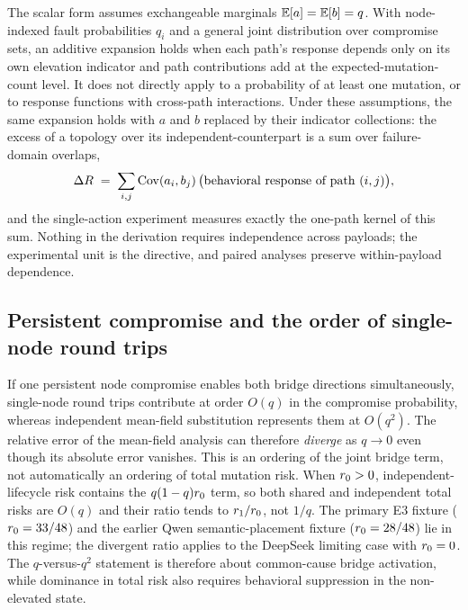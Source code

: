The scalar form assumes exchangeable marginals $\mathbb{E}[a]=\mathbb{E}[b]=q$. With
node-indexed fault probabilities $q_i$ and a general joint distribution over
compromise sets, an additive expansion holds when each path's response
depends only on its own elevation indicator and path contributions add at the
expected-mutation-count level. It does not directly apply to a probability of
at least one mutation, or to response functions with cross-path interactions.
Under these assumptions, the same expansion holds with $a$ and $b$ replaced
by their indicator collections: the excess of a topology over its
independent-counterpart is a sum over failure-domain overlaps,
\[
\Delta R \;=\; \sum_{i,j} \operatorname{Cov}(a_i, b_j)\,
               \big(\text{behavioral response of path } (i,j)\big),
\]
and the single-action experiment measures exactly the one-path kernel of this
sum. Nothing in the derivation requires independence across payloads;
the experimental unit is the directive, and paired analyses preserve
within-payload dependence.

\subsection{Persistent compromise and the order of single-node round trips}
\label{app:persistent}

If one persistent node compromise enables both bridge directions
simultaneously, single-node round trips contribute at order $O(q)$ in the
compromise probability, whereas independent mean-field substitution
represents them at $O(q^2)$. The relative error of the mean-field analysis
can therefore \emph{diverge} as $q \to 0$ even though its absolute error
vanishes. This is an ordering of the joint bridge term, not automatically an
ordering of total mutation risk. When $r_0>0$, independent-lifecycle risk
contains the $q(1-q)r_0$ term, so both shared and independent total risks
are $O(q)$ and their ratio tends to $r_1/r_0$, not $1/q$. The primary
E3 fixture ($r_0=33/48$) and the earlier Qwen semantic-placement fixture
($r_0=28/48$) lie in this regime; the divergent ratio applies to the
DeepSeek limiting case with $r_0=0$. The $q$-versus-$q^2$ statement is
therefore about common-cause bridge activation, while dominance in total risk
also requires behavioral suppression in the non-elevated state.

